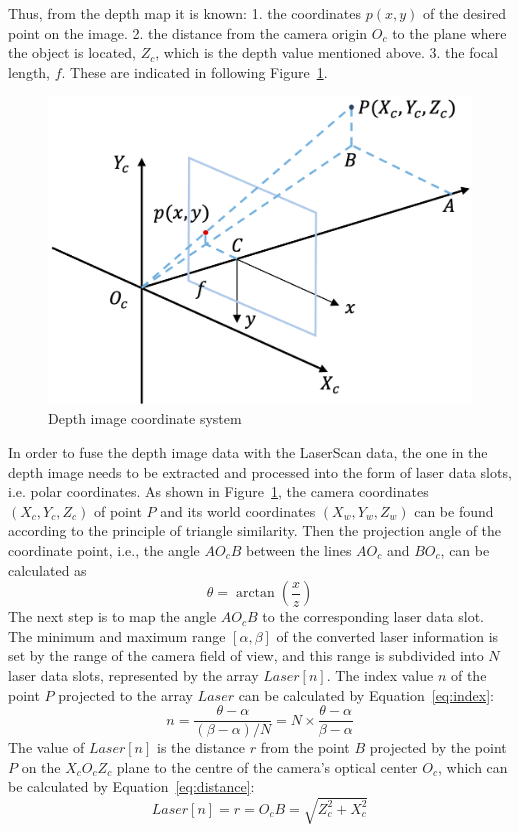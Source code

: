 Thus, from the depth map it is known: 
1. the coordinates $p(x, y)$ of the desired point on the image. 
2. the distance from the camera origin $O_c$ to the plane where the object is located, $Z_c$, which is the depth value mentioned above. 
3. the focal length, $f$. These are indicated in following Figure~\ref{fig:depth_coordinate}.
\begin{figure}[H]
    \centering
    \includegraphics[width=0.5\linewidth]{figs/coordinate.png}
    \caption{Depth image coordinate system}
    \label{fig:depth_coordinate}
\end{figure}
In order to fuse the depth image data with the LaserScan data, 
the one in the depth image needs to be extracted and processed into the form of laser data slots, i.e. polar coordinates. 
As shown in Figure~\ref{fig:depth_coordinate}, the camera coordinates $(X_c, Y_c, Z_c)$ of point $P$ and its world coordinates $(X_w, Y_w, Z_w)$ 
can be found according to the principle of triangle similarity. 
Then the projection angle of the coordinate point, i.e., the angle $AO_cB$ between the lines $AO_c$ and $BO_c$, can be calculated as 
\begin{equation}
    \theta=\arctan{(\frac{x}{z})}
\end{equation}
The next step is to map the angle $AO_cB$ to the corresponding laser data slot. 
The minimum and maximum range $[\alpha, \beta]$ of the converted laser information is set by the range of the camera field of view, 
and this range is subdivided into $N$ laser data slots, represented by the array $Laser[n]$. 
The index value $n$ of the point $P$ projected to the array $Laser$ can be calculated by Equation~\ref{eq:index}:
\begin{equation}
    n=\frac{\theta-\alpha}{(\beta-\alpha)/N}=N\times\frac{\theta-\alpha}{\beta-\alpha}
    \label{eq:index}
\end{equation}
The value of $Laser[n]$ is the distance $r$ from the point $B$ projected 
by the point $P$ on the $X_cO_cZ_c$ plane to the centre of the camera's optical center $O_c$, 
which can be calculated by Equation~\ref{eq:distance}:
\begin{equation}
    Laser[n]=r=O_cB=\sqrt{Z_c^2+X_c^2}
    \label{eq:distance}
\end{equation}

